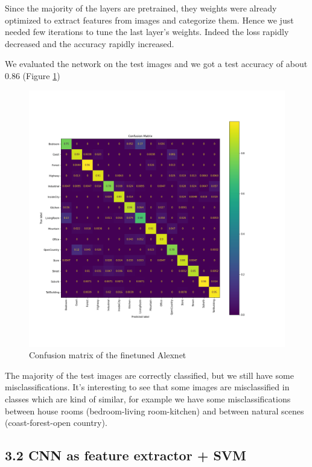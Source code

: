 \documentclass[12pt, a4paper]{report}
\begin{document}
Since the majority of the layers are  pretrained, they weights were already optimized to extract features from images and categorize them. Hence we just needed few iterations to tune the last layer's weights. Indeed the loss rapidly decreased and the accuracy rapidly increased.

We evaluated the network on the test images and we got a test accuracy of about 0.86 (Figure \ref{fig:alexnetresults})

\begin{figure}[h!]
	\centering
	\includegraphics[width=\textwidth]{img/conf_finetune}
	\caption{Confusion matrix of the finetuned Alexnet}	
	\label{fig:alexnetresults}
\end{figure}

The majority of the test images are correctly classified, but we still have some misclassifications.
It's interesting to see that some images are misclassified in classes which are kind of similar, for example we have some misclassifications between house rooms (bedroom-living room-kitchen) and between natural scenes (coast-forest-open country).

\subsection*{3.2 CNN as feature extractor + SVM}
\end{document}
